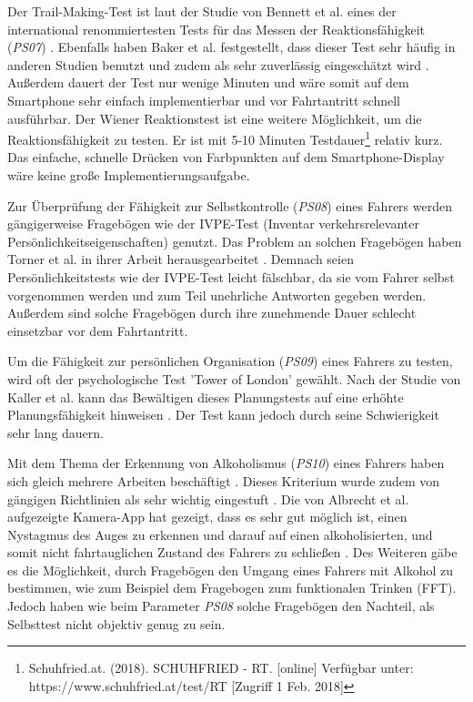 Der Trail-Making-Test  ist laut der Studie von Bennett et al. eines der international renommiertesten Tests für das Messen der Reaktionsfähigkeit (\textit{PS07}) \cite{cognitivetestsfitnesstodrive}. Ebenfalls haben Baker et al. festgestellt, dass dieser Test sehr häufig in anderen Studien benutzt  und zudem als sehr zuverlässig eingeschätzt wird \cite{reviewofassessmenttests}. Außerdem dauert der Test nur wenige Minuten und wäre somit auf dem Smartphone sehr einfach implementierbar und vor Fahrtantritt schnell ausführbar. Der Wiener Reaktionstest ist eine weitere Möglichkeit, um die Reaktionsfähigkeit zu testen. Er ist mit 5-10 Minuten Testdauer\footnote{Schuhfried.at. (2018). SCHUHFRIED - RT. [online] Verfügbar unter: https://www.schuhfried.at/test/RT [Zugriff 1 Feb. 2018]} relativ kurz. Das einfache, schnelle Drücken von Farbpunkten auf dem Smartphone-Display wäre keine große Implementierungsaufgabe.

Zur Überprüfung der Fähigkeit zur Selbstkontrolle (\textit{PS08}) eines Fahrers werden gängigerweise Fragebögen wie der IVPE-Test (Inventar verkehrsrelevanter Persönlichkeitseigenschaften) genutzt. Das Problem an solchen Fragebögen haben Torner et al. in ihrer Arbeit herausgearbeitet \cite{verfalschbarkeitivpe}. Demnach seien Persönlichkeitstests wie der IVPE-Test leicht fälschbar, da sie vom Fahrer selbst vorgenommen werden und zum Teil unehrliche Antworten gegeben werden. Außerdem sind solche Fragebögen durch ihre zunehmende Dauer schlecht einsetzbar vor dem Fahrtantritt.

Um die Fähigkeit zur persönlichen Organisation (\textit{PS09}) eines Fahrers zu testen, wird oft der psychologische Test 'Tower of London' gewählt. Nach der Studie von Kaller et al. kann das Bewältigen dieses Planungstests auf eine erhöhte Planungsfähigkeit hinweisen \cite{toweroflondon}. Der Test kann jedoch durch seine Schwierigkeit sehr lang dauern.

Mit dem Thema der Erkennung von Alkoholismus (\textit{PS10}) eines Fahrers haben sich gleich mehrere Arbeiten beschäftigt \cite{mobilesmarttracking,sobrietymobiletests}. Dieses Kriterium wurde zudem von gängigen Richtlinien als sehr wichtig eingestuft \cite{begutachtungsrichtlinien,testverfahrenpsychometrischefahreignung,beurteilungskriterien,drivervehiclelicencingagency}. Die von Albrecht et al. aufgezeigte Kamera-App hat gezeigt, dass es sehr gut möglich ist, einen Nystagmus des Auges zu erkennen und darauf auf einen alkoholisierten, und somit nicht fahrtauglichen Zustand des Fahrers zu schließen \cite{mobilesmarttracking}. Des Weiteren gäbe es die Möglichkeit, durch Fragebögen den Umgang eines Fahrers mit Alkohol zu bestimmen, wie zum Beispiel dem Fragebogen zum funktionalen Trinken (FFT). Jedoch haben wie beim Parameter \textit{PS08} solche Fragebögen den Nachteil, als Selbsttest nicht objektiv genug zu sein.

